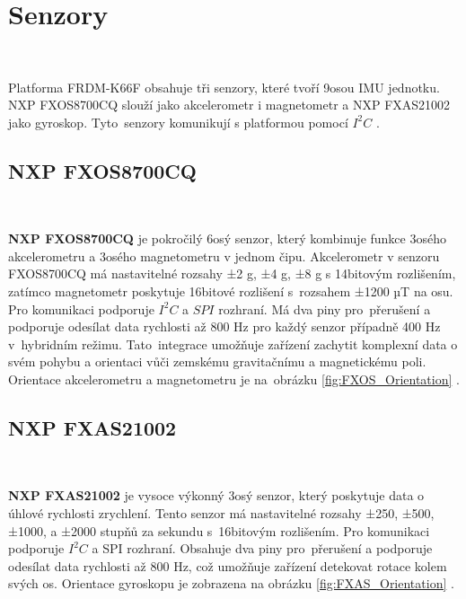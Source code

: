 \chapter{Senzory}
\label{sec:Sensors}
\

Platforma FRDM-K66F obsahuje tři senzory, které tvoří 9osou IMU jednotku.
NXP FXOS8700CQ slouží jako akcelerometr i magnetometr a NXP FXAS21002 jako gyroskop.
Tyto~senzory komunikují s platformou pomocí $I^2C$ \cite{frdmk66UserGuide}.

\section{NXP FXOS8700CQ}\

\textbf{NXP FXOS8700CQ} je pokročilý 6osý senzor, který kombinuje funkce 3osého
akcelerometru a 3osého magnetometru v jednom čipu. Akcelerometr v senzoru
FXOS8700CQ má nastavitelné rozsahy ±2 g, ±4 g, ±8 g s 14bitovým rozlišením, zatímco
magnetometr poskytuje 16bitové rozlišení s~rozsahem ±1200 µT na osu. Pro komunikaci
podporuje $I^2C$ a $SPI$ rozhraní. Má dva piny pro~přerušení a podporuje odesílat data
rychlosti až 800 Hz pro každý senzor případně 400 Hz v~hybridním režimu.
Tato~integrace umožňuje zařízení zachytit komplexní data o svém pohybu a orientaci
vůči zemskému gravitačnímu a magnetickému poli. Orientace akcelerometru a
magnetometru je na~obrázku \ref{fig:FXOS_Orientation} \cite{FXOS8700CQ}.

\section{NXP FXAS21002}\

\textbf{NXP FXAS21002} je vysoce výkonný 3osý senzor, který poskytuje data o úhlové
rychlosti zrychlení. Tento senzor má nastavitelné rozsahy ±250, ±500, ±1000, a
±2000 stupňů za sekundu s~16bitovým rozlišením. Pro komunikaci podporuje $I^2C$ a
SPI rozhraní. Obsahuje dva piny pro~přerušení a podporuje odesílat data rychlosti až
800 Hz, což umožňuje zařízení detekovat rotace kolem svých os. Orientace gyroskopu
je zobrazena na obrázku \ref{fig:FXAS_Orientation} \cite{FXAS21002}.


